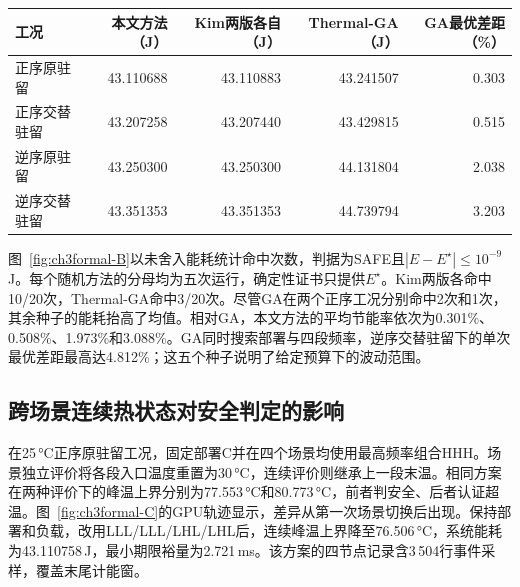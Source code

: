 \begin{table}\centering
{}
\label{tab:ch3formal-main}
\small\setlength{\tabcolsep}{4pt}
\begin{tabular}{lrrrr}\toprule
工况 & 本文方法（J） & Kim两版各自（J） & Thermal-GA（J） & GA最优差距（\%）\\\midrule
正序原驻留   & 43.110688 & 43.110883 & 43.241507 & 0.303\\
正序交替驻留 & 43.207258 & 43.207440 & 43.429815 & 0.515\\
逆序原驻留   & 43.250300 & 43.250300 & 44.131804 & 2.038\\
逆序交替驻留 & 43.351353 & 43.351353 & 44.739794 & 3.203\\\bottomrule
\end{tabular}
\end{table}
\ChThreeMainBreak
{}

图~\ref{fig:ch3formal-B}以未舍入能耗统计命中次数，判据为SAFE且$|E-E^\star|\leq 10^{-9}$\,J。每个随机方法的分母均为五次运行，确定性证书只提供$E^\star$。Kim两版各命中10/20次，Thermal-GA命中3/20次。尽管GA在两个正序工况分别命中2次和1次，其余种子的能耗抬高了均值。相对GA，本文方法的平均节能率依次为0.301\%、0.508\%、1.973\%和3.088\%。GA同时搜索部署与四段频率，逆序交替驻留下的单次最优差距最高达4.812\%；这五个种子说明了给定预算下的波动范围。

\ChThreeGroupBreak
\subsection{跨场景连续热状态对安全判定的影响}
在25\,°C正序原驻留工况，固定部署C并在四个场景均使用最高频率组合HHH。场景独立评价将各段入口温度重置为30\,°C，连续评价则继承上一段末温。相同方案在两种评价下的峰温上界分别为77.553\,°C和80.773\,°C，前者判安全、后者认证超温。图~\ref{fig:ch3formal-C}的GPU轨迹显示，差异从第一次场景切换后出现。保持部署和负载，改用LLL/LLL/LHL/LHL后，连续峰温上界降至76.506\,°C，系统能耗为43.110758\,J，最小期限裕量为2.721\,ms。该方案的四节点记录含3\,504行事件采样，覆盖末尾计能窗。

